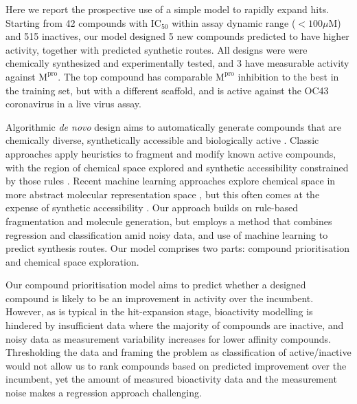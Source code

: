Here we report the prospective use of a simple model to rapidly expand hits. Starting from 42 compounds with $\mathrm{IC}_{50}$ within assay dynamic range ($<100 \mu$M) and 515 inactives, our model designed 5 new compounds predicted to have higher activity, together with predicted synthetic routes. All designs were were chemically synthesized and experimentally tested, and 3 have measurable activity against $\mathrm{M}^\mathrm{pro}$. The top compound has comparable $\mathrm{M}^\mathrm{pro}$ inhibition to the best in the training set, but with a different scaffold, and is active against the OC43 coronavirus in a live virus assay. 

Algorithmic \emph{de novo} design aims to automatically generate compounds that are chemically diverse, synthetically accessible and biologically active \cite{schneider2016novo}. Classic approaches apply heuristics to fragment and modify known active compounds, with the region of chemical space explored and synthetic accessibility constrained by those rules \cite{brown2004graph,patel2009knowledge,hartenfeller2012dogs}. Recent machine learning approaches explore chemical space in more abstract molecular representation space \cite{gomez2018automatic,segler2018generating}, but this often comes at the expense of synthetic accessibility \cite{gao2020synthesizability}. Our approach builds on rule-based fragmentation and molecule generation, but employs a method that combines regression and classification amid noisy data, and use of machine learning to predict synthesis routes. Our model comprises two parts: compound prioritisation and chemical space exploration. 

Our compound prioritisation model aims to predict whether a designed compound is likely to be an improvement in activity over the incumbent. However, as is typical in the hit-expansion stage, bioactivity modelling is hindered by insufficient data where the majority of compounds are inactive, and noisy data as measurement variability increases for lower affinity compounds. Thresholding the data and framing the problem as classification of active/inactive would not allow us to rank compounds based on predicted improvement over the incumbent, yet the amount of measured bioactivity data and the measurement noise  makes a regression approach challenging.


